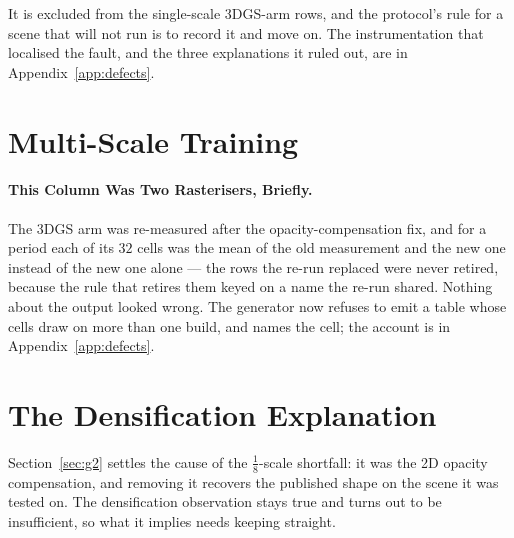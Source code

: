It is excluded from the single-scale 3DGS-arm rows, and the protocol's rule for
a scene that will not run is to record it and move on. The instrumentation that
localised the fault, and the three explanations it ruled out, are in
Appendix~\ref{app:defects}.
\section{Multi-Scale Training}
\label{sec:table2}



\paragraph{This Column Was Two Rasterisers, Briefly.} The 3DGS arm was re-measured
after the opacity-compensation fix, and for a period each of its $32$ cells was the mean of the old measurement and the new one instead of the new one alone --- the rows the re-run
replaced were never retired, because the rule that retires them keyed on a name
the re-run shared. Nothing about the output looked wrong. The generator now
refuses to emit a table whose cells draw on more than one build, and names the
cell; the account is in Appendix~\ref{app:defects}.
\section{The Densification Explanation}
\label{sec:densification}

Section~\ref{sec:g2} settles the cause of the $\tfrac18$-scale shortfall: it was
the 2D opacity compensation, and removing it recovers the published shape on the
scene it was tested on. The densification observation stays true and turns out to be insufficient, so
what it implies needs keeping straight.


